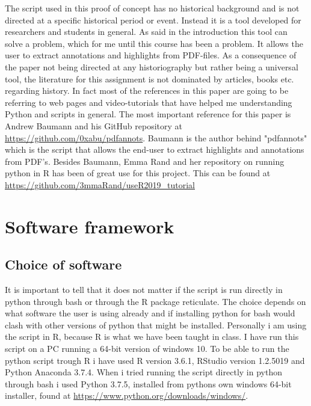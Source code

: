 \documentclass{article}
\begin{document}
The script used in this proof of concept has no historical background and is not directed at a specific historical period or event. Instead it is a tool developed for researchers and students in general. As said in the introduction this tool can solve a problem, which for me until this course has been a problem. It allows the user to extract annotations and highlights from PDF-files.
As a consequence of the paper not being directed at any historiography but rather being a universal tool, the literature for this assignment is not dominated by articles, books etc. regarding history. In fact most of the references in this paper are going to be referring to web pages and video-tutorials that have helped me understanding Python and scripts in general.
The most important reference for this paper is Andrew Baumann and his GitHub repository at \url{https://github.com/0xabu/pdfannots}. Baumann is the author behind "pdfannots" which is the script that allows the end-user to extract highlights and annotations from PDF's. Besides Baumann, Emma Rand and her repository on running python in R has been of great use for this project. This can be found at \url{https://github.com/3mmaRand/useR2019_tutorial}

\section{Software framework}
\subsection{Choice of software}
It is important to tell that it does not matter if the script is run directly in python through bash or through the R package reticulate. The choice depends on what software the user is using already and if installing python for bash would clash with other versions of python that might be installed. Personally i am using the script in R, because R is what we have been taught in class. I have run this script on a PC running a 64-bit version of windows 10. To be able to run the python script trough R i have used R version 3.6.1, RStudio version 1.2.5019 and Python Anaconda 3.7.4. When i tried running the script directly in python through bash i used Python 3.7.5, installed from pythons own windows 64-bit installer, found at \url{https://www.python.org/downloads/windows/}.
\end{document}

